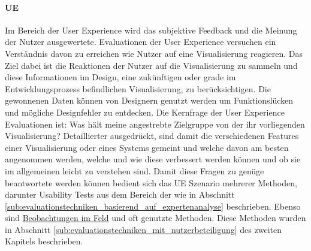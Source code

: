 \documentclass[draft=false
              ,paper=a4
              ,twoside=false
              ,fontsize=11pt
              ,headsepline
              ,BCOR10mm
              ,DIV11
              ]{scrbook}
\begin{document}
 \paragraph{UE} %
 \label{par:ue}
 Im Bereich der User Experience wird das subjektive Feedback und die Meinung der Nutzer ausgewertete. Evaluationen der User Experience versuchen ein Verständnis davon zu erreichen wie Nutzer auf eine Visualisierung reagieren. Das Ziel dabei ist die Reaktionen der Nutzer auf die Visualisierung zu sammeln und diese Informationen im Design, eine zukünftigen oder grade im Entwicklungsprozess befindlichen Visualisierung, zu berücksichtigen. Die gewonnenen Daten können von Designern genutzt werden um Funktionslücken und mögliche Designfehler zu entdecken. Die Kernfrage der User Experience Evaluationen ist: Was hält meine angestrebte Zielgruppe von der ihr vorliegenden Visualisierung? Detaillierter ausgedrückt, sind damit die verschiedenen Features einer Visualisierung oder eines Systems gemeint und welche davon am besten angenommen werden, welche und wie diese verbessert werden können und ob sie im allgemeinen leicht zu verstehen sind. Damit diese Fragen zu genüge beantwortete werden können bedient sich das UE Szenario mehrerer Methoden, darunter Usability Tests aus dem Bereich der  wie in Abschnitt \ref{sub:evaluationstechniken_basierend_auf_expertenanalyse} beschrieben. Ebenso sind \hyperref[ssub:techniken_auf_grundlage_von_beobachtungen]{Beobachtungen im Feld} und  oft genutzte Methoden. Diese Methoden wurden in Abschnitt \ref{sub:evaluationstechniken_mit_nutzerbeteiligung} des zweiten Kapitels beschrieben.
\end{document}
